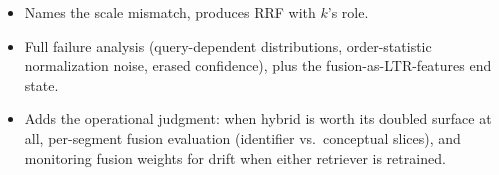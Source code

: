 \begin{interviewq}

\goodgreat
\begin{itemize}
    \item {} Names the scale mismatch, produces RRF with $k$'s role.
    \item {} Full failure analysis (query-dependent distributions, order-statistic normalization noise, erased confidence), plus the fusion-as-LTR-features end state.
    \item {} Adds the operational judgment: when hybrid is worth its doubled surface at all, per-segment fusion evaluation (identifier vs.\ conceptual slices), and monitoring fusion weights for drift when either retriever is retrained.
\end{itemize}

\end{interviewq}


